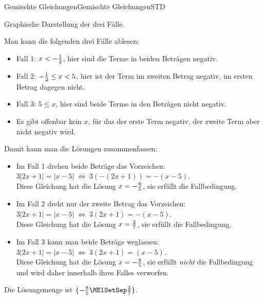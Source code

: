 \begin{MXContent}{Gemischte Gleichungen}{Gemischte Gleichungen}{STD}
\begin{MExercise}
\begin{MHint}{\iSolution}
\begin{center}
{
}
\par
Graphische Darstellung der drei Fälle.
\end{center}

Man kann die folgenden drei Fälle ablesen:
\begin{itemize}
\item{Fall 1: $x<-\tfrac{1}{2}$, hier sind die Terme in beiden Beträgen negativ.}
\item{Fall 2: $-\tfrac{1}{2}\leq x<5$, hier ist der Term im zweiten Betrag negativ, im ersten Betrag dagegen nicht.}
\item{Fall 3: $5\leq x$, hier sind beide Terme in den Beträgen nicht negativ.}
\item{Es gibt offenbar kein $x$, für das der erste Term negativ, der zweite Term aber nicht negativ wird.}
\end{itemize}

Damit kann man die Lösungen zusammenfassen:
\begin{itemize}
\item{Im Fall 1 drehen beide Beträge das Vorzeichen: $3|2x+1|=|x-5|\;\Leftrightarrow\;3(-(2x+1)) = -(x-5)$.\\Diese Gleichung hat die Lösung $x=-\tfrac{8}{5}$, sie erfüllt die Fallbedingung.}
\item{Im Fall 2 dreht nur der zweite Betrag das Vorzeichen: $3|2x+1|=|x-5|\;\Leftrightarrow\;3(2x+1) = -(x-5)$.\\Diese Gleichung hat die Lösung $x=\tfrac{2}{7}$, sie erfüllt die Fallbedingung.}
\item{Im Fall 3 kann man beide Beträge weglassen: $3|2x+1|=|x-5|\;\Leftrightarrow\;3(2x+1) = (x-5)$.\\Diese Gleichung hat die Lösung $x=-\tfrac{8}{5}$, sie erfüllt \textit{nicht} die Fallbedingung und wird daher innerhalb ihres Falles verworfen.}
\end{itemize}
Die Lösungsmenge ist $\lbrace -\Mtfrac85\MElSetSep \Mtfrac27\rbrace$.
\end{MHint}
\end{MExercise}


\end{MXContent}

